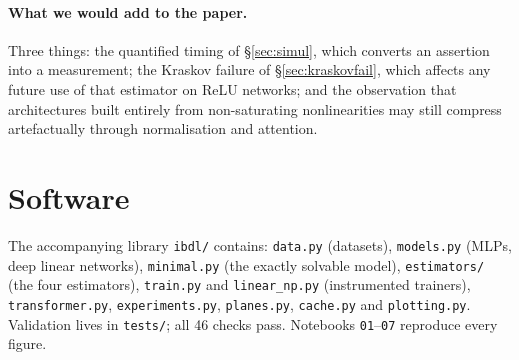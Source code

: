 \documentclass[11pt,a4paper]{article}
\begin{document}
\paragraph{What we would add to the paper.} Three things: the quantified timing
of \S\ref{sec:simul}, which converts an assertion into a measurement; the Kraskov
failure of \S\ref{sec:kraskovfail}, which affects any future use of that
estimator on ReLU networks; and the observation that architectures built entirely
from non-saturating nonlinearities may still compress artefactually through
normalisation and attention.



\appendix
\section{Software}

The accompanying library \texttt{ibdl/} contains: \texttt{data.py} (datasets),
\texttt{models.py} (MLPs, deep linear networks), \texttt{minimal.py} (the exactly
solvable model), \texttt{estimators/} (the four estimators),
\texttt{train.py} and \texttt{linear\_np.py} (instrumented trainers),
\texttt{transformer.py}, \texttt{experiments.py}, \texttt{planes.py},
\texttt{cache.py} and \texttt{plotting.py}. Validation lives in \texttt{tests/};
all 46 checks pass. Notebooks \texttt{01}--\texttt{07} reproduce every figure.
\end{document}
